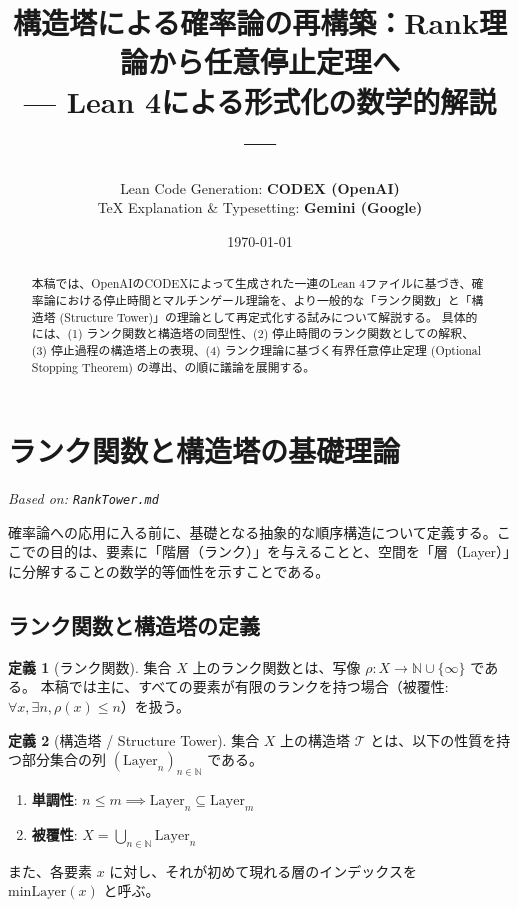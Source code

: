 \documentclass[a4paper,11pt]{ltjsarticle}
\title{\textbf{構造塔による確率論の再構築：Rank理論から任意停止定理へ} \\ \large --- Lean 4による形式化の数学的解説 ---}
\author{
    Lean Code Generation: \textbf{CODEX (OpenAI)} \\
    TeX Explanation \& Typesetting: \textbf{Gemini (Google)}
}
\date{\today}
\theoremstyle{definition}
\newtheorem{definition}{定義}[section]
\newcommand{\N}{\mathbb{N}}
\newcommand{\Rank}{\rho}
\newcommand{\Tower}{\mathcal{T}}
\newcommand{\Layer}[1]{\mathrm{Layer}_{#1}}
\newcommand{\MinLayer}{\mathrm{minLayer}}
\begin{document}
\maketitle

\begin{abstract}
本稿では、OpenAIのCODEXによって生成された一連のLean 4ファイルに基づき、確率論における停止時間とマルチンゲール理論を、より一般的な「ランク関数」と「構造塔 (Structure Tower)」の理論として再定式化する試みについて解説する。
具体的には、(1) ランク関数と構造塔の同型性、(2) 停止時間のランク関数としての解釈、(3) 停止過程の構造塔上の表現、(4) ランク理論に基づく有界任意停止定理 (Optional Stopping Theorem) の導出、の順に議論を展開する。
\end{abstract}

\tableofcontents

\newpage

\section{ランク関数と構造塔の基礎理論}
\label{sec:rank_tower}
\textit{Based on: \texttt{RankTower.md}}

確率論への応用に入る前に、基礎となる抽象的な順序構造について定義する。ここでの目的は、要素に「階層（ランク）」を与えることと、空間を「層（Layer）」に分解することの数学的等価性を示すことである。

\subsection{ランク関数と構造塔の定義}

\begin{definition}[ランク関数]
集合 $X$ 上のランク関数とは、写像 $\Rank: X \to \N \cup \{\infty\}$ である。
本稿では主に、すべての要素が有限のランクを持つ場合（被覆性: $\forall x, \exists n, \Rank(x) \le n$）を扱う。
\end{definition}

\begin{definition}[構造塔 / Structure Tower]
集合 $X$ 上の構造塔 $\Tower$ とは、以下の性質を持つ部分集合の列 $(\Layer{n})_{n \in \N}$ である。
\begin{enumerate}
    \item \textbf{単調性}: $n \le m \implies \Layer{n} \subseteq \Layer{m}$
    \item \textbf{被覆性}: $X = \bigcup_{n \in \N} \Layer{n}$
\end{enumerate}
また、各要素 $x$ に対し、それが初めて現れる層のインデックスを $\MinLayer(x)$ と呼ぶ。
\end{definition}
\end{document}
